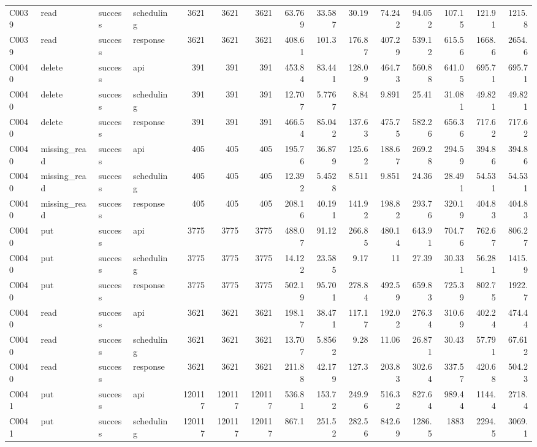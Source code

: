 \begin{landscape}
\begin{longtable}{llllrrrrrrrrrrr}
C0039 & read & success & scheduling & 3621 & 3621 & 3621 & 63.769 & 33.587 & 30.19 & 74.242 & 94.052 & 107.15 & 121.91 & 1215.8\\
C0039 & read & success & response & 3621 & 3621 & 3621 & 408.61 & 101.3 & 176.87 & 407.29 & 539.12 & 615.56 & 1668.6 & 2654.6\\
C0040 & delete & success & api & 391 & 391 & 391 & 453.84 & 83.441 & 128.09 & 464.73 & 560.88 & 641.05 & 695.71 & 695.71\\
C0040 & delete & success & scheduling & 391 & 391 & 391 & 12.707 & 5.7767 & 8.84 & 9.891 & 25.41 & 31.081 & 49.821 & 49.821\\
C0040 & delete & success & response & 391 & 391 & 391 & 466.54 & 85.042 & 137.63 & 475.75 & 582.26 & 656.36 & 717.62 & 717.62\\
C0040 & missing\_\allowbreak{}read & success & api & 405 & 405 & 405 & 195.76 & 36.879 & 125.62 & 188.67 & 269.28 & 294.59 & 394.86 & 394.86\\
C0040 & missing\_\allowbreak{}read & success & scheduling & 405 & 405 & 405 & 12.392 & 5.4528 & 8.511 & 9.851 & 24.36 & 28.491 & 54.531 & 54.531\\
C0040 & missing\_\allowbreak{}read & success & response & 405 & 405 & 405 & 208.16 & 40.191 & 141.92 & 198.82 & 293.76 & 320.19 & 404.83 & 404.83\\
C0040 & put & success & api & 3775 & 3775 & 3775 & 488.07 & 91.12 & 266.85 & 480.14 & 643.91 & 704.76 & 762.67 & 806.27\\
C0040 & put & success & scheduling & 3775 & 3775 & 3775 & 14.122 & 23.585 & 9.17 & 11 & 27.39 & 30.331 & 56.281 & 1415.9\\
C0040 & put & success & response & 3775 & 3775 & 3775 & 502.19 & 95.701 & 278.84 & 492.59 & 659.83 & 725.39 & 802.75 & 1922.7\\
C0040 & read & success & api & 3621 & 3621 & 3621 & 198.17 & 38.471 & 117.17 & 192.02 & 276.34 & 310.69 & 402.24 & 474.44\\
C0040 & read & success & scheduling & 3621 & 3621 & 3621 & 13.707 & 5.8562 & 9.28 & 11.06 & 26.871 & 30.43 & 57.791 & 67.612\\
C0040 & read & success & response & 3621 & 3621 & 3621 & 211.88 & 42.179 & 127.3 & 203.83 & 302.64 & 337.57 & 420.68 & 504.23\\
C0041 & put & success & api & 120117 & 120117 & 120117 & 536.81 & 153.72 & 249.96 & 516.32 & 827.64 & 989.44 & 1144.4 & 2718.4\\
C0041 & put & success & scheduling & 120117 & 120117 & 120117 & 867.1 & 251.52 & 282.56 & 842.69 & 1286.5 & 1883 & 2294.5 & 3069.1\\

\end{longtable}
\end{landscape}
